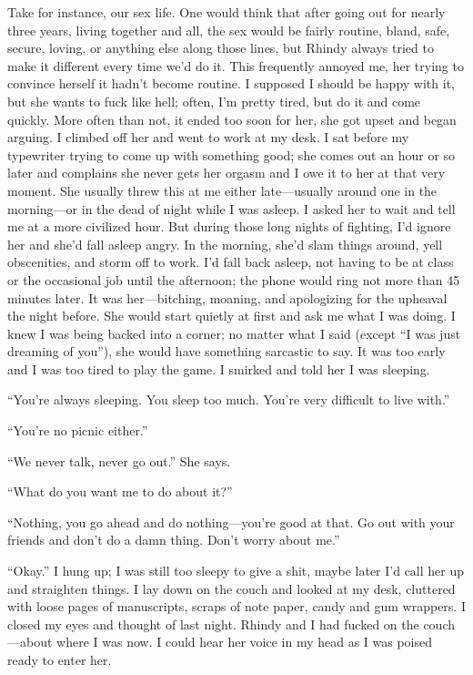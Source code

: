 Take for instance, our sex life. One would think that after going out
for nearly three years, living together and all, the sex would be fairly
routine, bland, safe, secure, loving, or anything else along those
lines, but Rhindy always tried to make it different every time we'd do
it. This frequently annoyed me, her trying to convince herself it hadn't
become routine. I supposed I should be happy with it, but she wants to
fuck like hell; often, I'm pretty tired, but do it and come quickly.
More often than not, it ended too soon for her, she got upset and began
arguing. I climbed off her and went to work at my desk. I sat before my
typewriter trying to come up with something good; she comes out an hour
or so later and complains she never gets her orgasm and I owe it to her
at that very moment. She usually threw this at me either late---usually
around one in the morning---or in the dead of night while I was asleep.
I asked her to wait and tell me at a more civilized hour. But during
those long nights of fighting, I'd ignore her and she'd fall asleep
angry. In the morning, she'd slam things around, yell obscenities, and
storm off to work. I'd fall back asleep, not having to be at class or
the occasional job until the afternoon; the phone would ring not more
than 45 minutes later. It was her---bitching, moaning, and apologizing
for the upheaval the night before. She would start quietly at first and
ask me what I was doing. I knew I was being backed into a corner; no
matter what I said (except ``I was just dreaming of you''), she would
have something sarcastic to say. It was too early and I was too tired to
play the game. I smirked and told her I was sleeping.

``You're always sleeping. You sleep too much. You're very difficult to
live with.''

``You're no picnic either.''

``We never talk, never go out.'' She says.

``What do you want me to do about it?''

``Nothing, you go ahead and do nothing---you're good at that. Go out
with your friends and don't do a damn thing. Don't worry about me.''

``Okay.'' I hung up; I was still too sleepy to give a shit, maybe later
I'd call her up and straighten things. I lay down on the couch and
looked at my desk, cluttered with loose pages of manuscripts, scraps of
note paper, candy and gum wrappers. I closed my eyes and thought of last
night. Rhindy and I had fucked on the couch---about where I was now. I
could hear her voice in my head as I was poised ready to enter her.

